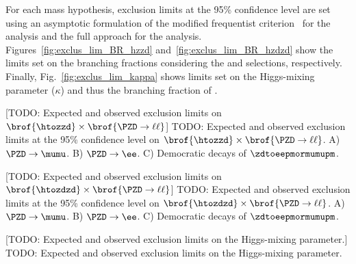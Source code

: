 For each mass hypothesis, exclusion limits at the 95\% confidence level are set using an asymptotic formulation of the modified frequentist \CLs criterion~\cite{cowan_asymptotic_2011, higgs_combo_proc_2011} for the \zzd analysis and the full \CLs approach for the \zdzd analysis.
Figures~\ref{fig:exclus_lim_BR_hzzd} and~\ref{fig:exclus_lim_BR_hzdzd} show the limits set on the branching fractions considering the \zzd and \zdzd selections, respectively.
Finally, Fig.~\ref{fig:exclus_lim_kappa} shows limits set on the Higgs-mixing parameter ($\kappa$) and thus the branching fraction of \htozdzd.
\begin{multiFigure}
        \centering
            [TODO: Expected and observed exclusion limits on $\brof{\htozzd} \times \brof{\PZD \to \ell\ell}$]
            {TODO:
            Expected and observed exclusion limits at the 95\% confidence level on $\brof{\htozzd} \times \brof{\PZD \to \ell\ell}$.
            A) $\PZD \to \mumu$.
            B) $\PZD \to \ee$.
            C) Democratic decays of $\zdtoeepmormumupm$.
            }
        \label{fig:exclus_lim_BR_hzzd}
\end{multiFigure}
\begin{multiFigure}
        \centering
            [TODO: Expected and observed exclusion limits on $\brof{\htozdzd} \times \brof{\PZD \to \ell\ell}$]
            {TODO:
            Expected and observed exclusion limits at the 95\% confidence level on $\brof{\htozdzd} \times \brof{\PZD \to \ell\ell}$.
            A) $\PZD \to \mumu$.
            B) $\PZD \to \ee$.
            C) Democratic decays of $\zdtoeepmormumupm$.
            }
        \label{fig:exclus_lim_BR_hzdzd}
\end{multiFigure}
\begin{multiFigure}
        \centering
            [TODO: Expected and observed exclusion limits on the Higgs-mixing parameter.]
            {TODO: Expected and observed exclusion limits on the Higgs-mixing parameter.}
        \label{fig:exclus_lim_kappa}
\end{multiFigure}


